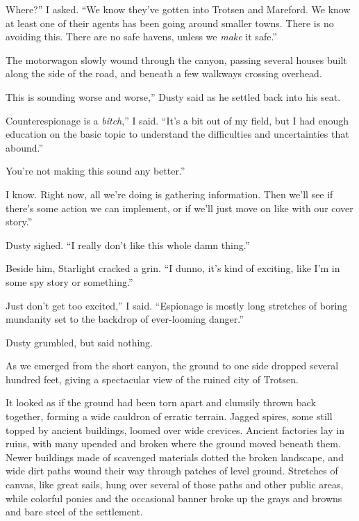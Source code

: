 \leavevmode{}Where?” I asked. “We know they’ve gotten into Trotsen and Mareford. We know at least one of their agents has been going around smaller towns. There is no avoiding this. There are no safe havens, unless we \textit{make} it safe.”

The motorwagon slowly wound through the canyon, passing several houses built along the side of the road, and beneath a few walkways crossing overhead.

\leavevmode{}This is sounding worse and worse,” Dusty said as he settled back into his seat.

\leavevmode{}Counterespionage is a \textit{bitch},” I said. “It’s a bit out of my field, but I had enough education on the basic topic to understand the difficulties and uncertainties that abound.”

\leavevmode{}You’re not making this sound any better.”

\leavevmode{}I know. Right now, all we’re doing is gathering information. Then we’ll see if there’s some action we can implement, or if we’ll just move on like with our cover story.”

Dusty sighed. “I really don’t like this whole damn thing.”

Beside him, Starlight cracked a grin. “I dunno, it’s kind of exciting, like I’m in some spy story or something.”

\leavevmode{}Just don’t get too excited,” I said. “Espionage is mostly long stretches of boring mundanity set to the backdrop of ever-looming danger.”

Dusty grumbled, but said nothing.

As we emerged from the short canyon, the ground to one side dropped several hundred feet, giving a spectacular view of the ruined city of Trotsen.

It looked as if the ground had been torn apart and clumsily thrown back together, forming a wide cauldron of erratic terrain. Jagged spires, some still topped by ancient buildings, loomed over wide crevices. Ancient factories lay in ruins, with many upended and broken where the ground moved beneath them. Newer buildings made of scavenged materials dotted the broken landscape, and wide dirt paths wound their way through patches of level ground. Stretches of canvas, like great sails, hung over several of those paths and other public areas, while colorful ponies and the occasional banner broke up the grays and browns and bare steel of the settlement.

